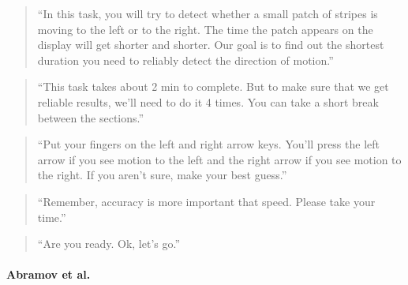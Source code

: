 \documentclass[]{article}
\let\oldparagraph\paragraph
\renewcommand{\paragraph}[1]{\oldparagraph{#1}\mbox{}}
\begin{document}
\begin{quote}
``In this task, you will try to detect whether a small patch of stripes
is moving to the left or to the right. The time the patch appears on the
display will get shorter and shorter. Our goal is to find out the
shortest duration you need to reliably detect the direction of motion.''
\end{quote}

\begin{quote}
``This task takes about 2 min to complete. But to make sure that we get
reliable results, we'll need to do it 4 times. You can take a short
break between the sections.''
\end{quote}

\begin{quote}
``Put your fingers on the left and right arrow keys. You'll press the
left arrow if you see motion to the left and the right arrow if you see
motion to the right. If you aren't sure, make your best guess.''
\end{quote}

\begin{quote}
``Remember, accuracy is more important that speed. Please take your
time.''
\end{quote}

\begin{quote}
``Are you ready. Ok, let's go.''
\end{quote}

\hypertarget{abramov-et-al.}{%
\paragraph{Abramov et al.}\label{abramov-et-al.}}
\end{document}
